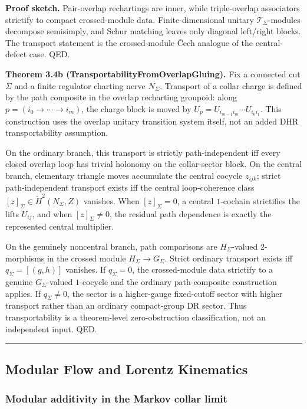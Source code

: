 \textbf{Proof sketch.} Pair-overlap rechartings are inner, while triple-overlap associators strictify to compact crossed-module data. Finite-dimensional unitary \(\mathcal T_\Sigma\)-modules decompose semisimply, and Schur matching leaves only diagonal left/right blocks. The transport statement is the crossed-module \v{C}ech analogue of the central-defect case. QED.

\textbf{Theorem 3.4b (TransportabilityFromOverlapGluing).} Fix a connected cut \(\Sigma\) and a finite regulator charting nerve \(N_\Sigma\). Transport of a collar charge is defined by the path composite in the overlap recharting groupoid: along \(p=(i_0\to\cdots\to i_m)\), the charge block is moved by \(U_p=U_{i_{m-1}i_m}\cdots U_{i_0i_1}\). This construction uses the overlap unitary transition system itself, not an added DHR transportability assumption.

On the ordinary branch, this transport is strictly path-independent iff every closed overlap loop has trivial holonomy on the collar-sector block. On the central branch, elementary triangle moves accumulate the central cocycle \(z_{ijk}\); strict path-independent transport exists iff the central loop-coherence class \([z]_\Sigma\in\check H^2(N_\Sigma,Z)\) vanishes. When \([z]_\Sigma=0\), a central \(1\)-cochain strictifies the lifts \(U_{ij}\), and when \([z]_\Sigma\ne0\), the residual path dependence is exactly the represented central multiplier.

On the genuinely noncentral branch, path comparisons are \(H_\Sigma\)-valued \(2\)-morphisms in the crossed module \(H_\Sigma\to G_\Sigma\). Strict ordinary transport exists iff \(q_\Sigma=[(g,h)]\) vanishes. If \(q_\Sigma=0\), the crossed-module data strictify to a genuine \(G_\Sigma\)-valued \(1\)-cocycle and the ordinary path-composite construction applies. If \(q_\Sigma\ne0\), the sector is a higher-gauge fixed-cutoff sector with higher transport rather than an ordinary compact-group DR sector. Thus transportability is a theorem-level zero-obstruction classification, not an independent input. QED.

\begin{center}\rule{0.5\linewidth}{0.5pt}\end{center}
\subsection{Modular Flow and Lorentz Kinematics}\label{4-modular-flow-and-lorentz-kinematics}

\subsubsection{Modular additivity in the Markov collar limit}\label{41-modular-additivity-in-the-markov-collar-limit}

